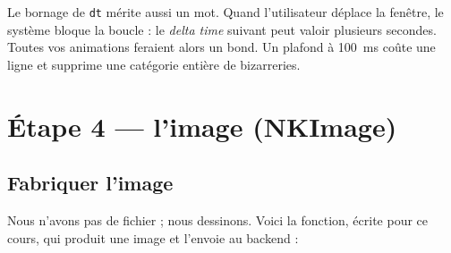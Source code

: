 Le bornage de \texttt{dt} mérite aussi un mot. Quand l'utilisateur déplace la
fenêtre, le système bloque la boucle : le \emph{delta time} suivant peut valoir
plusieurs secondes. Toutes vos animations feraient alors un bond. Un plafond à
100~ms coûte une ligne et supprime une catégorie entière de bizarreries.

\section{Étape 4 — l'image (NKImage)}

\subsection{Fabriquer l'image}

Nous n'avons pas de fichier ; nous dessinons. Voici la fonction, écrite pour ce
cours, qui produit une image et l'envoie au backend :

